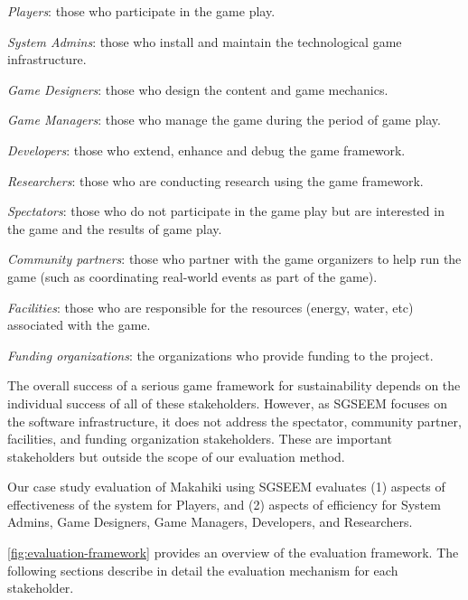 \documentclass{sigchi}
\begin{document}
\begin{compactitem}
\item \emph{Players}: those who participate in the game play.
\item \emph{System Admins}: those who install and maintain the technological game infrastructure.
\item \emph{Game Designers}: those who design the content and game mechanics.
 \item \emph{Game Managers}: those who manage the game during the period of game play.
\item \emph{Developers}: those who extend, enhance and debug the game framework.
\item \emph{Researchers}: those who are conducting research using the game framework.
\item \emph{Spectators}: those who do not participate in the game
  play but are interested in the game and the results of game play.
\item \emph{Community partners}: those who partner
  with the game organizers to help run the game (such as coordinating real-world events as part of the game).
\item \emph{Facilities}: those who are responsible for the resources (energy, water, etc)
  associated with the game.
\item \emph{Funding organizations}: the organizations who provide
  funding to the project.
\end{compactitem}

The overall success of a serious game framework for sustainability depends on the
individual success of all of these stakeholders. However, as SGSEEM focuses on the software
infrastructure, it does not address the spectator, community partner, facilities, and funding
organization stakeholders. These are important stakeholders but outside the scope of our
evaluation method.

Our case study evaluation of Makahiki using SGSEEM evaluates (1) aspects of 
effectiveness of the system for Players, and (2) aspects of
efficiency for System Admins, Game Designers, Game Managers, Developers, and Researchers.

\autoref{fig:evaluation-framework} provides an overview of the evaluation framework. The
following sections describe in detail the evaluation mechanism for each stakeholder.
\end{document}
